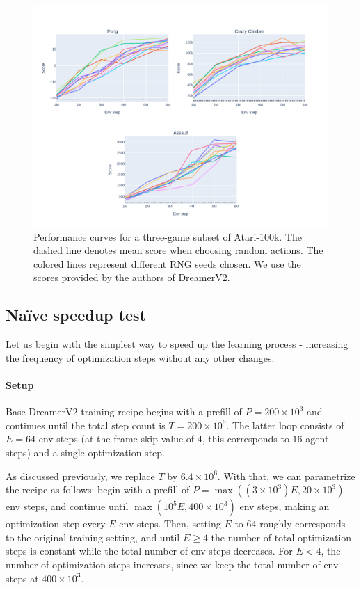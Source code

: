 \documentclass[twoside,11pt]{article}
\begin{document}
\begin{figure}
  \centering
  \includegraphics[width=0.8\linewidth,height=0.8\paperheight,keepaspectratio]{assets/perf_curves.pdf}
  \caption{Performance curves for a three-game subset of Atari-100k. The dashed line denotes mean score when choosing random actions. The colored lines represent different RNG seeds chosen. We use the scores provided by the authors of DreamerV2.}
  \label{fig:a100k_mono_perf}
\end{figure}

\subsection{Na\"ive speedup test}

Let us begin with the simplest way to speed up the learning process - increasing the frequency of optimization steps without any other changes.

\paragraph{Setup} Base DreamerV2 training recipe begins with a prefill of $P = 200 \times 10^3$ and continues until the total step count is $T = 200 \times 10^6$. The latter loop consists of $E = 64$ env steps (at the frame skip value of $4$, this corresponds to $16$ agent steps) and a single optimization step.

As discussed previously, we replace $T$ by $6.4 \times 10^6$. With that, we can parametrize the recipe as follows: begin with a prefill of $P = \max((3 \times 10^3)E, 20 \times 10^3)$ env steps, and continue until $\max(10^5 E, 400 \times 10^3)$ env steps, making an optimization step every $E$ env steps. Then, setting $E$ to $64$ roughly corresponds to the original training setting, and until $E \geq 4$ the number of total optimization steps is constant while the total number of env steps decreases. For $E < 4$, the number of optimization steps increases, since we keep the total number of env steps at $400 \times 10^3$.
\end{document}
